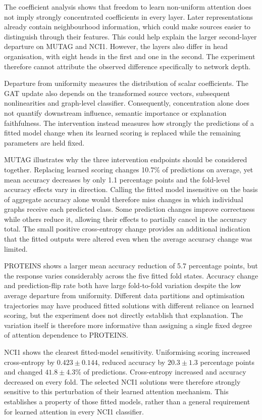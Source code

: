 \documentclass[11pt,a4paper]{article}
\begin{document}
The coefficient analysis shows that freedom to learn non-uniform attention does not imply strongly concentrated coefficients in every layer. Later representations already contain neighbourhood information, which could make sources easier to distinguish through their features. This could help explain the larger second-layer departure on MUTAG and NCI1. However, the layers also differ in head organisation, with eight heads in the first and one in the second. The experiment therefore cannot attribute the observed difference specifically to network depth.

Departure from uniformity measures the distribution of scalar coefficients. The GAT update also depends on the transformed source vectors, subsequent nonlinearities and graph-level classifier. Consequently, concentration alone does not quantify downstream influence, semantic importance or explanation faithfulness. The intervention instead measures how strongly the predictions of a fitted model change when its learned scoring is replaced while the remaining parameters are held fixed.

MUTAG illustrates why the three intervention endpoints should be considered together. Replacing learned scoring changes 10.7\% of predictions on average, yet mean accuracy decreases by only 1.1 percentage points and the fold-level accuracy effects vary in direction. Calling the fitted model insensitive on the basis of aggregate accuracy alone would therefore miss changes in which individual graphs receive each predicted class. Some prediction changes improve correctness while others reduce it, allowing their effects to partially cancel in the accuracy total. The small positive cross-entropy change provides an additional indication that the fitted outputs were altered even when the average accuracy change was limited.

PROTEINS shows a larger mean accuracy reduction of 5.7 percentage points, but the response varies considerably across the five fitted fold states. Accuracy change and prediction-flip rate both have large fold-to-fold variation despite the low average departure from uniformity. Different data partitions and optimisation trajectories may have produced fitted solutions with different reliance on learned scoring, but the experiment does not directly establish that explanation. The variation itself is therefore more informative than assigning a single fixed degree of attention dependence to PROTEINS.

NCI1 shows the clearest fitted-model sensitivity. Uniformising scoring increased cross-entropy by \(0.423\pm0.144\), reduced accuracy by \(20.3\pm1.3\) percentage points and changed \(41.8\pm4.3\%\) of predictions. Cross-entropy increased and accuracy decreased on every fold. The selected NCI1 solutions were therefore strongly sensitive to this perturbation of their learned attention mechanism. This establishes a property of those fitted models, rather than a general requirement for learned attention in every NCI1 classifier.
\end{document}
